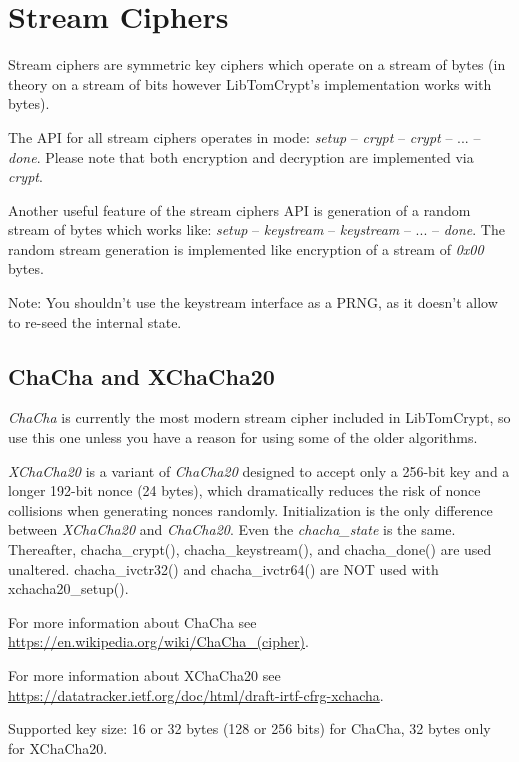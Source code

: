 \documentclass[synpaper]{book}
\newcommand{\mysection}[1]    %
	{                   %
	\section{#1}
   \markboth{\textsf{www.libtom.net}}{\thesection ~ {#1}}
	}
\begin{document}
\chapter{Stream Ciphers}

Stream ciphers are symmetric key ciphers which operate on a stream of bytes (in theory on a stream of bits
however LibTomCrypt's implementation works with bytes).

The API for all stream ciphers operates in mode: \textit{setup} -- \textit{crypt} -- \textit{crypt} -- ... -- \textit{done}.
Please note that both encryption and decryption are implemented via \textit{crypt}.

Another useful feature of the stream ciphers API is generation of a random stream of bytes which works like:
\textit{setup} -- \textit{keystream} -- \textit{keystream} -- ... -- \textit{done}. The random stream generation is
implemented like encryption of a stream of \textit{0x00} bytes.

Note: You shouldn't use the keystream interface as a PRNG, as it doesn't allow to re-seed the internal state.

\mysection{ChaCha and XChaCha20}

\textit{ChaCha} is currently the most modern stream cipher included in LibTomCrypt, so use this one unless you
have a reason for using some of the older algorithms.
\vspace{1mm}

\textit{XChaCha20} is a variant of \textit{ChaCha20} designed to accept only a 256-bit key and a
longer 192-bit nonce (24 bytes), which dramatically reduces the risk of nonce collisions when
generating nonces randomly.  Initialization is the only difference between \textit{XChaCha20}
and \textit{ChaCha20}.  Even the \textit{chacha\_state} is the same.  Thereafter,
chacha\_crypt(), chacha\_keystream(), and chacha\_done() are used unaltered.
chacha\_ivctr32() and chacha\_ivctr64() are NOT used with xchacha20\_setup().
\vspace{1mm}

For more information about ChaCha see \url{https://en.wikipedia.org/wiki/ChaCha_(cipher)}.
\vspace{1mm}

For more information about XChaCha20 see
\url{https://datatracker.ietf.org/doc/html/draft-irtf-cfrg-xchacha}.
\vspace{1mm}

Supported key size: 16 or 32 bytes (128 or 256 bits) for ChaCha, 32 bytes only for XChaCha20.
\end{document}

